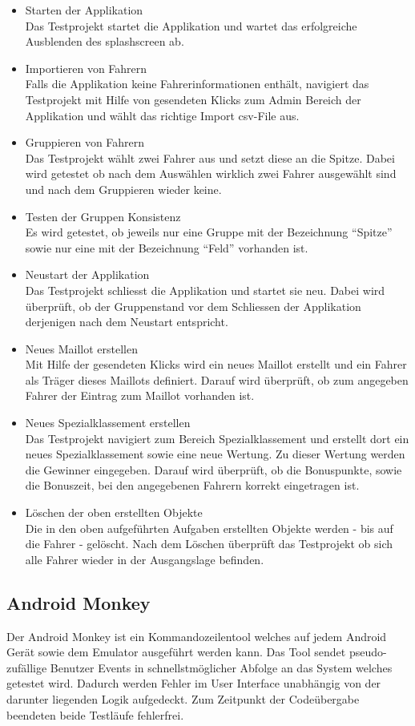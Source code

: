 \begin{itemize}
\item Starten der Applikation\\
Das Testprojekt startet die Applikation und wartet das erfolgreiche Ausblenden des \gls{splashscreen} ab.
\item Importieren von Fahrern\\
Falls die Applikation keine Fahrerinformationen enthält, navigiert das Testprojekt mit Hilfe von gesendeten Klicks zum Admin Bereich der Applikation und wählt das richtige Import \gls{csv}-File aus.
\item Gruppieren von Fahrern\\
Das Testprojekt wählt zwei Fahrer aus und setzt diese an die Spitze. Dabei wird getestet ob nach dem Auswählen wirklich zwei Fahrer ausgewählt sind und nach dem Gruppieren wieder keine.
\item Testen der Gruppen Konsistenz\\
Es wird getestet, ob jeweils nur eine Gruppe mit der Bezeichnung "`Spitze"' sowie nur eine mit der Bezeichnung "`Feld"' vorhanden ist.
\item Neustart der Applikation\\
Das Testprojekt schliesst die Applikation und startet sie neu. Dabei wird überprüft, ob der Gruppenstand vor dem Schliessen der Applikation derjenigen nach dem Neustart entspricht.
\item Neues Maillot erstellen\\
Mit Hilfe der gesendeten Klicks wird ein neues Maillot erstellt und ein Fahrer als Träger dieses Maillots definiert. Darauf wird überprüft, ob zum angegeben Fahrer der Eintrag zum Maillot vorhanden ist.
\item Neues Spezialklassement erstellen\\
Das Testprojekt navigiert zum Bereich Spezialklassement und erstellt dort ein neues Spezialklassement sowie eine neue Wertung. Zu dieser Wertung werden die Gewinner eingegeben. Darauf wird überprüft, ob die Bonuspunkte, sowie die Bonuszeit, bei den angegebenen Fahrern korrekt eingetragen ist.
\item Löschen der oben erstellten Objekte \\
Die in den oben aufgeführten Aufgaben erstellten Objekte werden - bis auf die Fahrer -  gelöscht. Nach dem Löschen überprüft das Testprojekt ob sich alle Fahrer wieder in der Ausgangslage befinden.
\end{itemize}

\subsection{Android Monkey}
Der Android Monkey ist ein Kommandozeilentool welches auf jedem Android Gerät sowie dem Emulator ausgeführt werden kann. Das Tool sendet pseudo-zufällige Benutzer Events in schnellstmöglicher Abfolge an das System welches getestet wird. Dadurch werden Fehler im User Interface unabhängig von der darunter liegenden Logik aufgedeckt. Zum Zeitpunkt der Codeübergabe beendeten beide Testläufe fehlerfrei.

